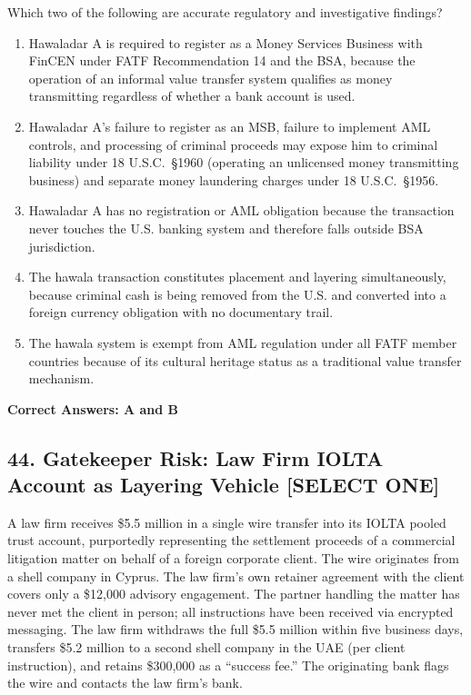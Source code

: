 \documentclass[11pt,a4paper]{article}
\begin{document}
	Which two of the following are accurate regulatory and investigative findings?
	
	\begin{enumerate}[label=\Alph*.]
		\item Hawaladar A is required to register as a Money Services Business with FinCEN under FATF Recommendation 14 and the BSA, because the operation of an informal value transfer system qualifies as money transmitting regardless of whether a bank account is used.
		\item Hawaladar A's failure to register as an MSB, failure to implement AML controls, and processing of criminal proceeds may expose him to criminal liability under 18 U.S.C.\ \S 1960 (operating an unlicensed money transmitting business) and separate money laundering charges under 18 U.S.C.\ \S 1956.
		\item Hawaladar A has no registration or AML obligation because the transaction never touches the U.S. banking system and therefore falls outside BSA jurisdiction.
		\item The hawala transaction constitutes placement and layering simultaneously, because criminal cash is being removed from the U.S. and converted into a foreign currency obligation with no documentary trail.
		\item The hawala system is exempt from AML regulation under all FATF member countries because of its cultural heritage status as a traditional value transfer mechanism.
	\end{enumerate}
	\textbf{Correct Answers: A and B}
	
	\subsection{44. Gatekeeper Risk: Law Firm IOLTA Account as Layering Vehicle \textnormal{[SELECT ONE]}}
	
	A law firm receives \$5.5 million in a single wire transfer into its IOLTA pooled trust account, purportedly representing the settlement proceeds of a commercial litigation matter on behalf of a foreign corporate client. The wire originates from a shell company in Cyprus. The law firm's own retainer agreement with the client covers only a \$12,000 advisory engagement. The partner handling the matter has never met the client in person; all instructions have been received via encrypted messaging. The law firm withdraws the full \$5.5 million within five business days, transfers \$5.2 million to a second shell company in the UAE (per client instruction), and retains \$300,000 as a ``success fee.'' The originating bank flags the wire and contacts the law firm's bank.
	
\end{document}
